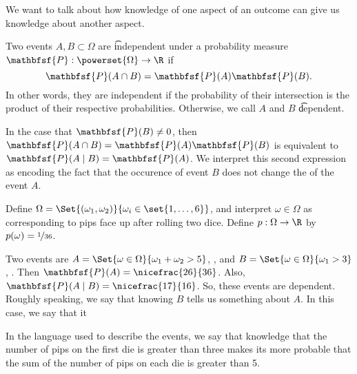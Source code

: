
We want to talk about how knowledge of one aspect of an outcome can give us knowledge about another aspect.


Two events $A, B \subset \Omega $ are \t{independent} under a probability measure $\mathbfsf{P} : \powerset{\Omega } \to \R $ if
  \[
\mathbfsf{P} (A \cap B) = \mathbfsf{P} (A)\mathbfsf{P} (B).
  \]
In other words, they are independent if the probability of their intersection is the product of their respective probabilities.
Otherwise, we call $A$ and $B$ \t{dependent}.

In the case that $\mathbfsf{P} (B) \neq 0$, then $\mathbfsf{P} (A \cap B) = \mathbfsf{P} (A)\mathbfsf{P} (B)$ is equivalent to $\mathbfsf{P} (A \mid B) = \mathbfsf{P} (A)$.
We interpret this second expression as encoding the fact that the occurence of event $B$ does not change the  of the event $A$.


Define $\Omega  = \Set{(\omega _1, \omega _2)}{ \omega _i \in \set{1, \dots, 6}}$, and interpret $\omega  \in \Omega $ as corresponding to pips face up after rolling two dice.
Define $p: \Omega  \to \R $ by $p(\omega ) = \nicefrac{1}{36}$.

Two events are $A = \Set{\omega  \in \Omega }{ \omega _1 + \omega _2 > 5}$, , and $B = \Set{\omega  \in \Omega }{\omega _1 > 3}$, .
Then $\mathbfsf{P} (A) = \nicefrac{26}{36}$.
Also, $\mathbfsf{P} (A \mid B) = \nicefrac{17}{16}$.
So, these events are dependent.
Roughly speaking, we say that knowing $B$ tells us something about $A$.
In this case, we say that it 

In the language used to describe the events, we say that knowledge that the number of pips on the first die is greater than three makes its more probable that the sum of the number of pips on each die is greater than 5.
